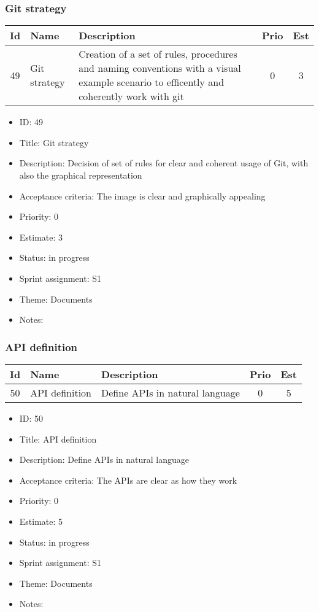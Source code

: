 \newpage
\subsubsection{Git strategy}
\begin{tabular}{|c|m{1.5cm}|m{4cm}|c|c|}
	\hline
	\textbf{Id}&\textbf{Name}&\textbf{Description}&\textbf{Prio}&\textbf{Est}\\
	\hline
	49 & Git strategy & 
	Creation of a set of rules, procedures and naming conventions with a visual example scenario to efficently and coherently work with git &
	0 & 3 \\
	\hline
\end{tabular}
\begin{itemize}
	\item ID: 49
	\item Title: Git strategy
	\item Description: Decision of set of rules for clear and coherent usage of Git, with also the graphical representation
	\item Acceptance criteria: The image is clear and graphically appealing
	\item Priority: 0
	\item Estimate: 3
	\item Status: in progress
	\item Sprint assignment: S1
	\item Theme: Documents
	\item Notes:
\end{itemize}

\newpage
\subsubsection{API definition}
\begin{tabular}{|c|m{1.5cm}|m{4cm}|c|c|}
	\hline
	\textbf{Id}&\textbf{Name}&\textbf{Description}&\textbf{Prio}&\textbf{Est}\\
	\hline
	50 & API definition & 
	Define APIs in natural language &
	0 & 5 \\
	\hline
\end{tabular}
\begin{itemize}
	\item ID: 50
	\item Title: API definition
	\item Description: Define APIs in natural language
	\item Acceptance criteria: The APIs are clear as how they work
	\item Priority: 0
	\item Estimate: 5
	\item Status: in progress
	\item Sprint assignment: S1
	\item Theme: Documents
	\item Notes:
\end{itemize}


